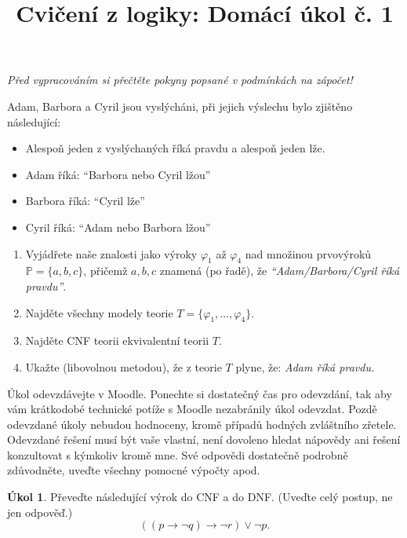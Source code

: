 \documentclass[a4paper]{amsart}
\title{\sc Cvičení z logiky: Domácí úkol č. 1}
\theoremstyle{definition}
\newtheorem{task}{Úkol}
\begin{document}
\medskip\begin{ukol}[2 body]
    {\it Před vypracováním si přečtěte pokyny popsané v podmínkách na zápočet!}
        
    \medskip    
        
    Adam, Barbora a Cyril jsou vyslýcháni, při jejich výslechu bylo zjištěno následující:
    \begin{itemize}\it
        \item Alespoň jeden z vyslýchaných říká pravdu a alespoň jeden lže.
        \item Adam říká: ``Barbora nebo Cyril lžou''
        \item Barbora říká: ``Cyril lže''
        \item Cyril říká: ``Adam nebo Barbora lžou''
    \end{itemize}
    \begin{enumerate}
        \item Vyjádřete naše znalosti jako výroky $\varphi_1$ až $\varphi_4$ nad množinou prvovýroků $\mathbb{P}=\{a,b,c\}$, přičemž $a,b,c$ znamená (po řadě), že {\it ``Adam/Barbora/Cyril říká pravdu''}.
        \item Najděte všechny modely teorie $T = \{\varphi_1, \dots, \varphi_4\}$.
        \item Najděte CNF teorii ekvivalentní teorii $T$.
        \item Ukažte (libovolnou metodou), že z teorie $T$ plyne, že: {\it Adam říká pravdu.}
    \end{enumerate}    
    \end{ukol}




\maketitle

\thispagestyle{empty}

Úkol odevzdávejte v Moodle. Ponechte si dostatečný čas pro odevzdání, tak aby vám krátkodobé technické potíže s Moodle nezabránily úkol odevzdat. Pozdě odevzdané úkoly nebudou hodnoceny, kromě případů hodných zvláštního zřetele. Odevzdané řešení musí být vaše vlastní, není dovoleno hledat nápovědy ani řešení konzultovat s kýmkoliv kromě mne. Své odpovědi dostatečně podrobně zdůvodněte, uveďte všechny pomocné výpočty apod.


\begin{task}
Převeďte následující výrok do CNF a do DNF. (Uveďte celý postup, ne jen odpověď.)
$$
((p\to \neg q) \to \neg r) \vee \neg p.
$$
\end{task}
\end{document}
